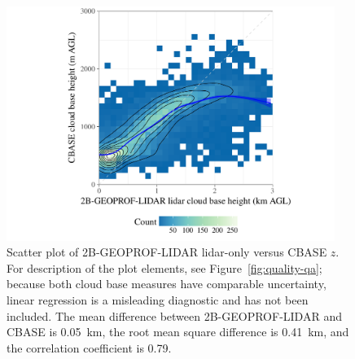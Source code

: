 \documentclass[essd,manuscript]{copernicus}\usepackage[]{graphicx}\usepackage[]{color}
\newenvironment{knitrout}{}{} %
\newcommand\CBH{\ensuremath{z}}
\begin{document}
\begin{figure}
  \centering
\begin{knitrout}
\color{fgcolor}

{\centering \includegraphics[width=0.95\textwidth]{figure/method-2bgeoprof-cbase-comparison-1} 

}



\end{knitrout}
  \caption{Scatter plot of 2B-GEOPROF-LIDAR lidar-only versus CBASE \CBH{}.  For
    description of the plot elements, see Figure~\ref{fig:quality-qa}; because
    both cloud base measures have comparable uncertainty, linear regression is a
    misleading diagnostic \citep{Pitkanen2016} and has not been included.  The mean
    difference between 2B-GEOPROF-LIDAR and CBASE is 0.05~\unit{km},
    the root mean square difference is 0.41~\unit{km}, and the
    correlation coefficient is 0.79.}
  \label{fig:comp-2b-cbase}
\end{figure}
\end{document}

